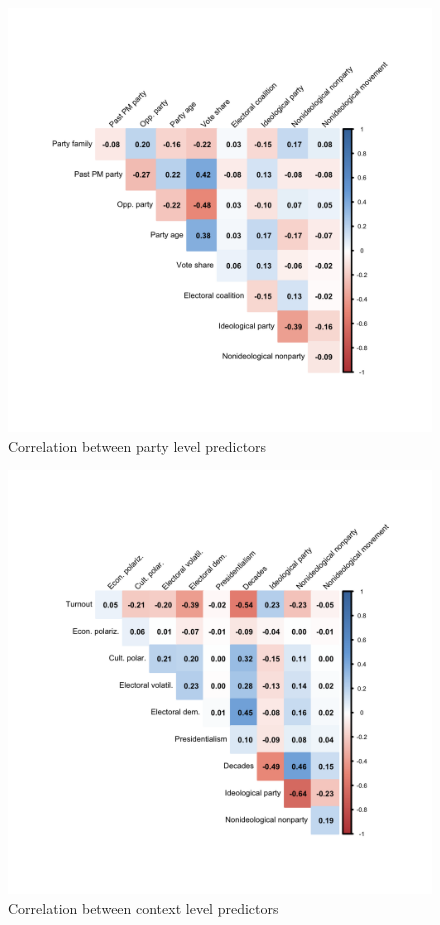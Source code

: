\documentclass[12pt]{article}
\begin{document}
\begin{figure}[H]
\centering
\includegraphics[width=\textwidth]{./Figures/corplot_party.png}
\caption{Correlation between party level predictors}
\end{figure}

\clearpage

\begin{figure}[H]
\centering
\includegraphics[width=\textwidth]{./Figures/corplot_context.png}
\caption{Correlation between context level predictors}
\end{figure}
\end{document}
